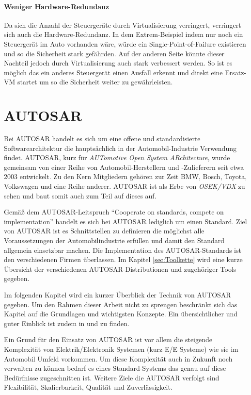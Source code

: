 \documentclass[
  a4paper,					    %
  twoside,
  DIV=calc,     				%
  bibliography=totoc,
  cleardoublepage=empty,
  ngerman,     					%
  final       					%
]{scrbook}
\begin{document}
\paragraph{Weniger Hardware-Redundanz}
Da sich die Anzahl der Steuergeräte durch Virtualisierung verringert, verringert sich auch die Hardware-Redundanz. In dem Extrem-Beispiel indem nur noch ein Steuergerät im Auto vorhanden wäre, würde ein Single-Point-of-Failure existieren und so die Sicherheit stark gefährden. Auf der anderen Seite könnte dieser Nachteil jedoch durch Virtualisierung auch stark verbessert werden. So ist es möglich das ein anderes Steuergerät einen Ausfall erkennt und direkt eine Ersatz-VM startet um so die Sicherheit weiter zu gewährleisten. 



\section{AUTOSAR}
\label{sec:Autosar}
Bei AUTOSAR handelt es sich um eine offene und standardisierte Softwarearchitektur die hauptsächlich in der Automobil-Industrie Verwendung findet. AUTOSAR, kurz für \emph{AUTomotive Open System ARchitecture}, wurde gemeinsam von einer Reihe von Automobil-Herstellern und -Zulieferern seit etwa 2003 entwickelt. Zu den Kern Mitgliedern gehören zur Zeit BMW, Bosch, Toyota, Volkswagen und eine Reihe anderer. AUTOSAR ist als Erbe von \emph{OSEK/VDX} zu sehen und baut somit auch zum Teil auf dieses auf.

Gemäß dem AUTOSAR-Leitspruch "`Cooperate on standards, compete on implementation"' handelt es sich bei AUTOSAR lediglich um einen Standard. Ziel von AUTOSAR ist es Schnittstellen zu definieren die möglichst alle Voraussetzungen der Automobilindustrie erfüllen und damit den Standard allgemein einsetzbar machen. Die Implementation des AUTOSAR-Standards ist den verschiedenen Firmen überlassen. Im Kapitel \ref{sec:Toolkette} wird eine kurze Übersicht der verschiedenen AUTOSAR-Distributionen und zugehöriger Tools gegeben.

Im folgenden Kapitel wird ein kurzer Überblick der Technik von AUTOSAR gegeben. Um den Rahmen dieser Arbeit nicht zu sprengen beschränkt sich das Kapitel auf die Grundlagen und wichtigsten Konzepte. Ein übersichtlicher und guter Einblick ist zudem in \cite{autosar_techoverview} und \cite{autosar_layer} zu finden.

Ein Grund für den Einsatz von AUTOSAR ist vor allem die steigende Komplexität von Elektrik/Elektronik Systemen (kurz E/E Systeme) wie sie im Automobil Umfeld vorkommen. Um diese Komplexität auch in Zukunft noch verwalten zu können bedarf es eines Standard-Systems das genau auf diese Bedürfnisse zugeschnitten ist. Weitere Ziele die AUTOSAR verfolgt sind Flexibilität, Skalierbarkeit, Qualität und Zuverlässigkeit.\cite[S. 5]{autosar_techoverview}
\end{document}
